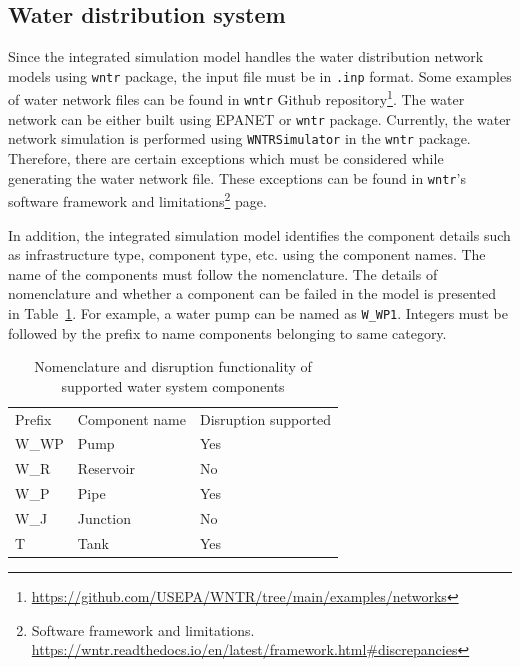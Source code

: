 \documentclass[letterpaper,12pt,english]{sphinxmanual}
\begin{document}
\subsection{Water distribution system}
Since the integrated simulation model handles the water distribution network models using {\tt wntr} package, the input file must be in {\tt .inp} format. Some examples of water network files can be found in {\tt wntr} Github repository\footnote{\href{https://github.com/USEPA/WNTR/tree/main/examples/networks}{https://github.com/USEPA/WNTR/tree/main/examples/networks}}. The water network can be either built using EPANET or {\tt wntr} package. Currently, the water network simulation is performed using {\tt WNTRSimulator} in the {\tt wntr} package. Therefore, there are certain exceptions which must be considered while generating the water network file. These exceptions can be found in {\tt wntr}'s software framework and limitations\footnote{Software framework and limitations. \href{https://wntr.readthedocs.io/en/latest/framework.html\#discrepancies}{{https://wntr.readthedocs.io/en/latest/framework.html\#discrepancies}}} page.

In addition, the integrated simulation model identifies the component details such as infrastructure type, component type, etc. using the component names. The name of the components must follow the nomenclature. The details of nomenclature and whether a component can be failed in the model is presented in Table~\ref{tab:water_compons}. For example, a water pump can be named as {\tt W\_WP1}. Integers must be followed by the prefix to name components belonging to same category.

\begin{table}[h]
	\centering
	\caption{Nomenclature and disruption functionality of supported water system components}
	\begin{tabular}{lll}
		\rowcolor[HTML]{C0C0C0} 
		Prefix & Component name & Disruption supported \\
		W\_WP  & Pump           & Yes                 \\
		\rowcolor[HTML]{EFEFEF} 
		W\_R   & Reservoir      & No                  \\
		W\_P   & Pipe           & Yes                 \\
		\rowcolor[HTML]{EFEFEF} 
		W\_J   & Junction       & No                  \\
		T      & Tank           & Yes                
	\end{tabular}
\label{tab:water_compons}
\end{table}
\end{document}
